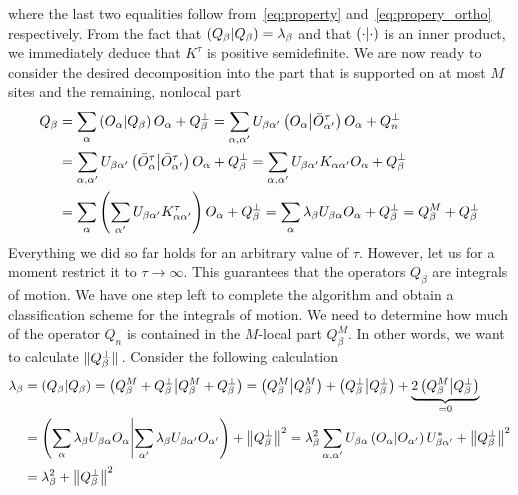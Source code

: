 where the last two equalities follow from~\eqref{eq:property} and~\eqref{eq:propery_ortho} respectively.
From the fact that \(\left(Q_{\beta} \middle| Q_{\beta}\right) = \lambda_{\beta}\) and that \(\left(\cdot \middle| \cdot\right)\) is an inner product,
we immediately deduce that \(K^{\tau}\) is positive semidefinite.
We are now ready to consider the desired decomposition into the part that is supported on at most \(M\) sites and the remaining, nonlocal part
\begin{align}
    Q_{\beta} &=  \sum_{\alpha} \left(O_{\alpha} \middle| Q_{\beta}\right)O_{\alpha} + Q_{\beta}^{\perp} = \sum_{\alpha,\alpha^{\prime}} U_{\beta \alpha^{\prime}}\left(O_{\alpha} \middle| \bar{O}_{\alpha^{\prime}}^{\tau}\right)
    O_{\alpha}+Q_{n}^{\perp} \nonumber \\
    &= \sum_{\alpha,\alpha^{\prime}} U_{\beta\alpha^{\prime}}\left(\bar{O}_{\alpha}^{\tau} \middle| \bar{O}_{\alpha^{\prime}}^{\tau}\right) O_{\alpha}+Q_{\beta}^{\perp}
    = \sum_{\alpha,\alpha^{\prime}} U_{\beta\alpha^{\prime}}K_{\alpha\alpha^{\prime}} O_{\alpha}+Q_{\beta}^{\perp} \nonumber \\
    &= \sum_{\alpha}  \left( \sum_{\alpha^{\prime}} U_{\beta\alpha^{\prime}}K_{\alpha\alpha^{\prime}}^{\tau}\right) O_{\alpha}+Q_{\beta}^{\perp} = \sum_{\alpha} 
    \lambda_{\beta} U_{\beta \alpha} O_{\alpha}+Q_{\beta}^{\perp} = Q_{\beta}^{M}+Q_{\beta}^{\perp}
    \label{eq:decomposition2}
  \end{align}
  Everything we did so far holds for an
arbitrary value of \(\tau\). However, let us for a moment restrict it to \(\tau\to \infty\).
This guarantees that the operators \(Q_{\beta}\) are integrals of motion.
  We have one step left to complete the algorithm and obtain a classification scheme for the
  integrals of motion. We need to determine how much of the operator \(Q_n\) is contained in the
  \(M\)-local part \(Q_{\beta}^M\). In other words, we want to calculate \(\norm*{Q_{\beta}^{\perp}}\).
  Consider the following calculation
  \begin{align}
    \lambda_{\beta} &= \left(Q_{\beta} \middle| Q_{\beta}\right) = \left(Q_{\beta}^M + Q_{\beta}^{\perp} \middle| Q_{\beta}^M + Q_{\beta}^{\perp}\right) = \left(Q_{\beta}^M \middle| Q_{\beta}^M\right) +
     \left(Q_{\beta}^{\perp} \middle| Q_{\beta}^{\perp}\right) + \underbrace{2 \left(Q_{\beta}^M \middle| Q_{\beta}^{\perp}\right)}_{=0} \nonumber \\
     &= \left(\sum_{\alpha} \lambda_{\beta} U_{\beta\alpha} O_{\alpha} \middle| \sum_{\alpha^{\prime}} \lambda_{\beta} U_{\beta\alpha^{\prime}} O_{\alpha^{\prime}}\right) + \norm{Q_{\beta}^{\perp}}^2 =
    \lambda_{\beta}^2 \sum_{\alpha,\alpha^{\prime}} U_{\beta\alpha} \left(O_{\alpha} \middle| O_{\alpha^{\prime}}\right) U_{\beta\alpha^{\prime}}^{\ast} + \norm{Q_{\beta}^{\perp}}^2  \nonumber \\
    &=\lambda_{\beta}^2 + \norm{Q_{\beta}^{\perp}}^2
  \end{align}
